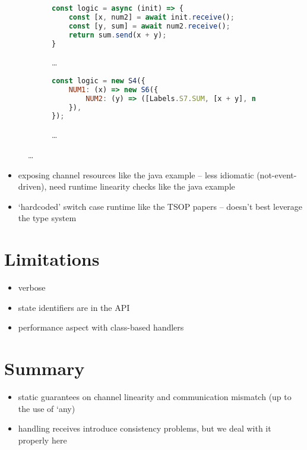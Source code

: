 \begin{figure}[!h]
\centering
\begin{subfigure}{\textwidth}
\begin{lstlisting}[language=javascript, tabsize=2]
const logic = async (init) => {
	const [x, num2] = await init.receive();
 	const [y, sum] = await num2.receive();
	return sum.send(x + y);
}
\end{lstlisting}
\caption{\dots}
\end{subfigure}
\hfill
\begin{subfigure}{\textwidth}
\begin{lstlisting}[language=javascript]
const logic = new S4({
	NUM1: (x) => new S6({
		NUM2: (y) => ([Labels.S7.SUM, [x + y], new S5()]),
	}),
});
\end{lstlisting}
\caption{\dots}
\end{subfigure}
\end{figure}

\begin{itemize}
\item exposing channel resources like the java example -- less idiomatic (not-event-driven), need runtime linearity checks like the java example
\item `hardcoded' switch case runtime like the TSOP papers -- doesn't best leverage the type system
\end{itemize}

\section{Limitations}
\label{section:nodelimitations}

\begin{itemize}
\item verbose
\item state identifiers are in the API
\item performance aspect with class-based handlers
\end{itemize}


\section{Summary}
\begin{itemize}
\item static guarantees on channel linearity and communication mismatch (up to the use of `any)
\item handling receives introduce consistency problems, but we deal with it properly here
\end{itemize}